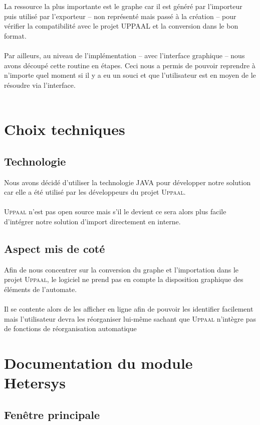 \documentclass[12pt,a4paper]{report}
\begin{document}
La ressource la plus importante est le graphe car il est généré par l'importeur 
puis utilisé par l'exporteur -- non représenté mais passé à la création -- pour 
vérifier la compatibilité avec le projet UPPAAL et la conversion dans le bon format.
\\\\
Par ailleurs, au niveau de l'implémentation -- avec l'interface graphique -- nous 
avons découpé cette routine en étapes. Ceci nous a permis de pouvoir reprendre 
à n'importe quel moment si il y a eu un souci et que l'utilisateur est en moyen de 
le résoudre via l'interface.
\\\\

\section{Choix techniques}
\subsection*{Technologie}
Nous avons décidé d'utiliser la technologie JAVA pour développer notre 
solution car elle a été utilisé par les développeurs du projet \textsc{Uppaal}.
\\\\
\textsc{Uppaal} n'est pas open source mais s'il le devient ce sera alors plus facile d'intégrer
notre solution d'import directement en interne.

\subsection*{Aspect mis de coté}
Afin de nous concentrer sur la conversion du graphe et l'importation dans le projet \textsc{Uppaal},
le logiciel ne prend pas en compte la disposition graphique des éléments de l'automate.
\\\\
Il se contente alors de les afficher en ligne afin de pouvoir les identifier facilement mais 
l'utilisateur devra les réorganiser lui-même sachant que \textsc{Uppaal} n'intègre pas de fonctions de 
réorganisation automatique

\section{Documentation du module Hetersys}
\subsection{Fenêtre principale}
\end{document}
